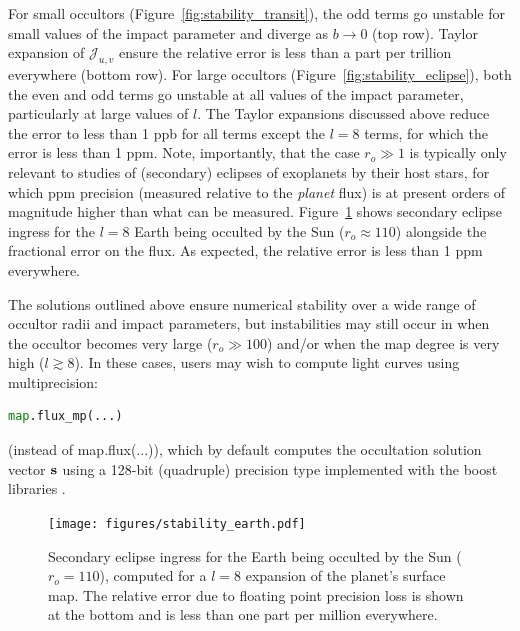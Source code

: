 \documentclass[modern]{aastex61}
\begin{document}
{For small occultors (Figure~\ref{fig:stability_transit}), the odd terms go unstable for small values
of the impact parameter and diverge as $b \rightarrow 0$ (top row). Taylor expansion of $\mathcal{J}_{u,v}$
ensure the relative error is less than a part per trillion everywhere (bottom row).
For large occultors (Figure~\ref{fig:stability_eclipse}), both the even and odd terms go unstable at all values of the impact parameter,
particularly at large values of $l$. The Taylor expansions discussed above reduce the error to less
than 1 ppb for all terms except the $l = 8$ terms, for which the error is less than 1 ppm.
Note, importantly, that the case $r_o \gg 1$ is typically only relevant to studies of
(secondary) eclipses of exoplanets by their host stars, for which ppm precision (measured relative
to the \emph{planet} flux) is at present orders of magnitude higher than what can be measured.
Figure~\ref{fig:stability_earth} shows secondary eclipse ingress for the $l = 8$ Earth being
occulted by the Sun ($r_o \approx 110$) alongside the fractional error on the flux.
As expected, the relative error is less than 1 ppm everywhere.

The solutions outlined above ensure numerical stability over a wide range of occultor radii and impact
parameters, but instabilities may still occur in \starry when the occultor becomes very large
($r_o \gg 100$) and/or when the map degree is very high ($l \gtrsim 8$). In these cases, users may wish
to compute light curves using multiprecision:
%
\begin{lstlisting}[language=Python,firstnumber=last]
map.flux_mp(...)
\end{lstlisting}
%
(instead of \textsf{map.flux(...)}), which by default computes the occultation solution
vector ${\mathbf{s}}$ using a 128-bit (quadruple) precision type implemented with the \textsf{boost}
\cpp libraries \citep[e.g.,][]{Schaling2014}.

\begin{figure}[ht!]
    \begin{centering}
    \texttt{[image: figures/stability\_earth.pdf]}
    \caption{\label{fig:stability_earth}
             Secondary eclipse ingress for the Earth being occulted by the Sun
             ($r_o = 110$), computed for a $l = 8$ expansion of the planet's
             surface map. The relative error due to floating point precision loss
             is shown at the bottom and is
             less than one part per million everywhere.}
    \end{centering}
\end{figure}

}
\end{document}
